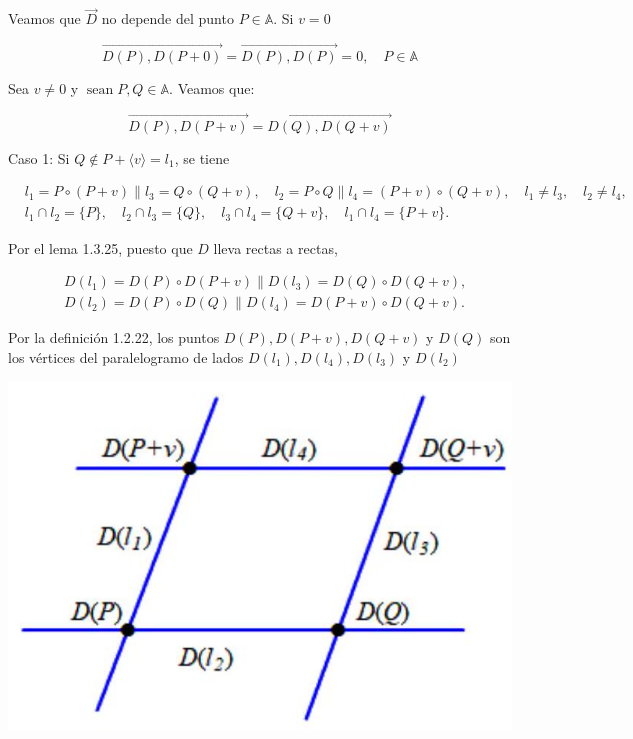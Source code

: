 \documentclass[12pt, a4paper, ones, notitlepage, openany,titlepage]{article}
\begin{document}
Veamos que $\vec{D}$ no depende del punto $P \in \mathbb{A}$. Si $v=0$

$$
\overrightarrow{D(P), D(P+0)}=\overrightarrow{D(P), D(P)}=0, \quad P \in \mathbb{A}
$$

Sea $v \neq 0$ y $\operatorname{sean} P, Q \in \mathbb{A}$. Veamos que:

$$
\overrightarrow{D(P), D(P+v)}=\overrightarrow{D(Q), D(Q+v)}
$$

Caso 1: Si $Q \notin P+\langle v\rangle=l_{1}$, se tiene

$$
\begin{aligned}
& l_{1}=P \circ(P+v)\left\|l_{3}=Q \circ(Q+v), \quad l_{2}=P \circ Q\right\| l_{4}=(P+v) \circ(Q+v), \quad l_{1} \neq l_{3}, \quad l_{2} \neq l_{4}, \\
& l_{1} \cap l_{2}=\{P\}, \quad l_{2} \cap l_{3}=\{Q\}, \quad l_{3} \cap l_{4}=\{Q+v\}, \quad l_{1} \cap l_{4}=\{P+v\} .
\end{aligned}
$$

Por el lema 1.3.25, puesto que $D$ lleva rectas a rectas,

$$
\begin{aligned}
& D\left(l_{1}\right)=D(P) \circ D(P+v) \| D\left(l_{3}\right)=D(Q) \circ D(Q+v), \\
& D\left(l_{2}\right)=D(P) \circ D(Q) \| D\left(l_{4}\right)=D(P+v) \circ D(Q+v) .
\end{aligned}
$$

Por la definición 1.2.22, los puntos $D(P), D(P+v), D(Q+v)$ y $D(Q)$ son los vértices del paralelogramo de lados $D\left(l_{1}\right), D\left(l_{4}\right), D\left(l_{3}\right)$ y $D\left(l_{2}\right)$

\begin{center}
\includegraphics[max width=\textwidth]{2023_03_01_7659aec5e35f9a9b2d3cg-31}
\end{center}
\end{document}
